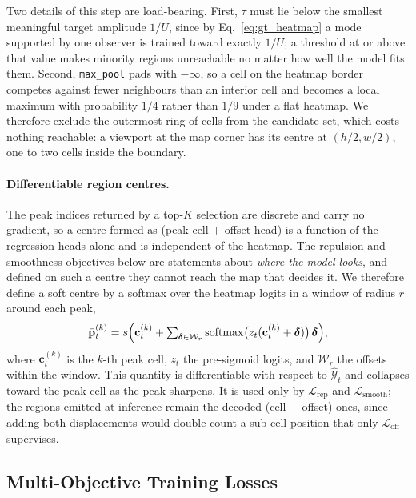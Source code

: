 \documentclass[preprint,12pt]{elsarticle}
\begin{document}
Two details of this step are load-bearing. First, $\tau$ must lie below the
smallest meaningful target amplitude $1/U$, since by Eq.~\ref{eq:gt_heatmap} a
mode supported by one observer is trained toward exactly $1/U$; a threshold at
or above that value makes minority regions unreachable no matter how well the
model fits them. Second, \texttt{max\_pool} pads with $-\infty$, so a cell on
the heatmap border competes against fewer neighbours than an interior cell and
becomes a local maximum with probability $1/4$ rather than $1/9$ under a flat
heatmap. We therefore exclude the outermost ring of cells from the candidate
set, which costs nothing reachable: a viewport at the map corner has its centre
at $(h/2, w/2)$, one to two cells inside the boundary.

\paragraph{Differentiable region centres.} The peak indices returned by a
top-$K$ selection are discrete and carry no gradient, so a centre formed as
(peak cell $+$ offset head) is a function of the regression heads alone and is
independent of the heatmap. The repulsion and smoothness objectives below are
statements about \emph{where the model looks}, and defined on such a centre
they cannot reach the map that decides it. We therefore define a soft centre by
a softmax over the heatmap logits in a window of radius $r$ around each peak,
\begin{equation}
  \bar{\mathbf{p}}^{(k)}_t = s\Bigl(\mathbf{c}^{(k)}_t +
    \textstyle\sum_{\boldsymbol{\delta} \in \mathcal{W}_r}
    \mathrm{softmax}\bigl(z_t(\mathbf{c}^{(k)}_t + \boldsymbol{\delta})\bigr)\,
    \boldsymbol{\delta}\Bigr),
  \label{eq:soft_center}
\end{equation}
where $\mathbf{c}^{(k)}_t$ is the $k$-th peak cell, $z_t$ the pre-sigmoid
logits, and $\mathcal{W}_r$ the offsets within the window. This quantity is
differentiable with respect to $\hat{\mathcal{Y}}_t$ and collapses toward the
peak cell as the peak sharpens. It is used only by
$\mathcal{L}_{\text{rep}}$ and $\mathcal{L}_{\text{smooth}}$; the regions
emitted at inference remain the decoded (cell $+$ offset) ones, since adding
both displacements would double-count a sub-cell position that only
$\mathcal{L}_{\text{off}}$ supervises.

\subsection{Multi-Objective Training Losses}
\label{subsec:losses}
\end{document}
